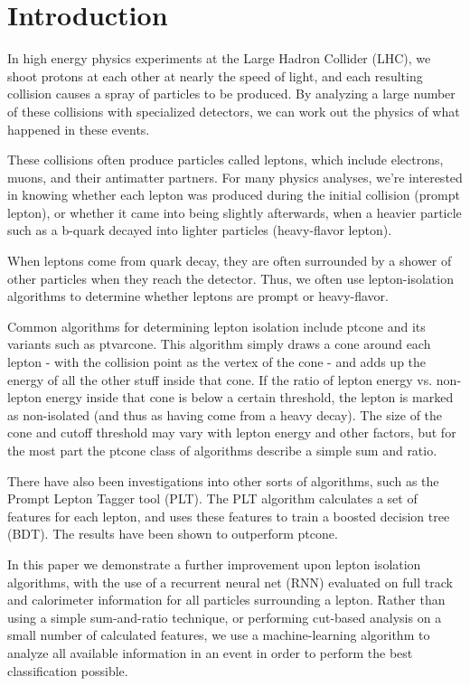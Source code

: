 \section{Introduction}\label{sec:intro}


In high energy physics experiments at the Large Hadron Collider (LHC), we shoot protons at each other at nearly the speed of light, and each resulting collision causes a spray of particles to be produced. By analyzing a large number of these collisions with specialized detectors, we can work out the physics of what happened in these events.

These collisions often produce particles called leptons, which include electrons, muons, and their antimatter partners. For many physics analyses, we're interested in knowing whether each lepton was produced during the initial collision (prompt lepton), or whether it came into being slightly afterwards, when a heavier particle such as a b-quark decayed into lighter particles (heavy-flavor lepton).

When leptons come from quark decay, they are often surrounded by a shower of other particles when they reach the detector. Thus, we often use lepton-isolation algorithms to determine whether leptons are prompt or heavy-flavor.


Common algorithms for determining lepton isolation include ptcone and its variants such as ptvarcone. This algorithm simply draws a cone around each lepton - with the collision point as the vertex of the cone - and adds up the energy of all the other stuff inside that cone. If the ratio of lepton energy vs. non-lepton energy inside that cone is below a certain threshold, the lepton is marked as non-isolated (and thus as having come from a heavy decay). The size of the cone and cutoff threshold may vary with lepton energy and other factors, but for the most part the ptcone class of algorithms describe a simple sum and ratio.

There have also been investigations into other sorts of algorithms, such as the Prompt Lepton Tagger tool (PLT). The PLT algorithm calculates a set of features for each lepton, and uses these features to train a boosted decision tree (BDT). The results have been shown to outperform ptcone.


In this paper we demonstrate a further improvement upon lepton isolation algorithms, with the use of a recurrent neural net (RNN) evaluated on full track and calorimeter information for all particles surrounding a lepton. Rather than using a simple sum-and-ratio technique, or performing cut-based analysis on a small number of calculated features, we use a machine-learning algorithm to analyze all available information in an event in order to perform the best classification possible.

